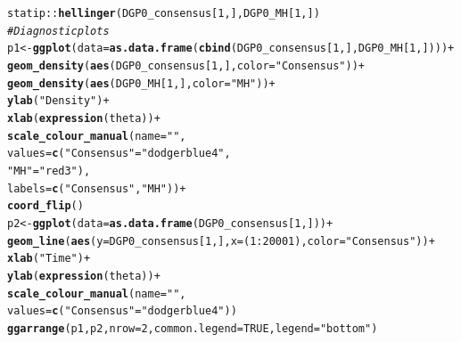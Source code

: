 \documentclass[11pt,a4paper]{report}\usepackage[]{graphicx}\usepackage[]{color}
\makeatletter
\newcommand{\hlnum}[1]{\textcolor[rgb]{0.686,0.059,0.569}{#1}}%
\newcommand{\hlstr}[1]{\textcolor[rgb]{0.192,0.494,0.8}{#1}}%
\newcommand{\hlcom}[1]{\textcolor[rgb]{0.678,0.584,0.686}{\textit{#1}}}%
\newcommand{\hlopt}[1]{\textcolor[rgb]{0,0,0}{#1}}%
\newcommand{\hlstd}[1]{\textcolor[rgb]{0.345,0.345,0.345}{#1}}%
\newcommand{\hlkwb}[1]{\textcolor[rgb]{0.69,0.353,0.396}{#1}}%
\newcommand{\hlkwc}[1]{\textcolor[rgb]{0.333,0.667,0.333}{#1}}%
\newcommand{\hlkwd}[1]{\textcolor[rgb]{0.737,0.353,0.396}{\textbf{#1}}}%
\newenvironment{kframe}{%
 \def\at@end@of@kframe{}%
 \ifinner\ifhmode%
  \def\at@end@of@kframe{\end{minipage}}%
  \begin{minipage}{\columnwidth}%
 \fi\fi%
 \def\FrameCommand##1{\hskip\@totalleftmargin \hskip-\fboxsep
 \colorbox{shadecolor}{##1}\hskip-\fboxsep
     \hskip-\linewidth \hskip-\@totalleftmargin \hskip\columnwidth}%
 \MakeFramed {\advance\hsize-\width
   \@totalleftmargin\z@ \linewidth\hsize
   \@setminipage}}%
 {\par\unskip\endMakeFramed%
 \at@end@of@kframe}
\newenvironment{knitrout}{}{} %
\makeatother
\begin{document}
\begin{appendix}
\begin{knitrout}
\begin{kframe}
\begin{alltt}
\hlstd{statip}\hlopt{::}\hlkwd{hellinger}\hlstd{(DGP0_consensus[}\hlnum{1}\hlstd{,],DGP0_MH[}\hlnum{1}\hlstd{,])}
\hlcom{#Diagnostic plots}
\hlstd{p1}\hlkwb{<-}\hlkwd{ggplot}\hlstd{(}\hlkwc{data}\hlstd{=}\hlkwd{as.data.frame}\hlstd{(}\hlkwd{cbind}\hlstd{(DGP0_consensus[}\hlnum{1}\hlstd{,],DGP0_MH[}\hlnum{1}\hlstd{,])))}\hlopt{+}
 \hlkwd{geom_density}\hlstd{(}\hlkwd{aes}\hlstd{(DGP0_consensus[}\hlnum{1}\hlstd{,],}\hlkwc{color}\hlstd{=}\hlstr{"Consensus"}\hlstd{))}\hlopt{+}
 \hlkwd{geom_density}\hlstd{(}\hlkwd{aes}\hlstd{(DGP0_MH[}\hlnum{1}\hlstd{,],}\hlkwc{color}\hlstd{=}\hlstr{"MH"}\hlstd{))}\hlopt{+}
 \hlkwd{ylab}\hlstd{(}\hlstr{"Density"}\hlstd{)}\hlopt{+}
 \hlkwd{xlab}\hlstd{(}\hlkwd{expression}\hlstd{(theta))}\hlopt{+}
 \hlkwd{scale_colour_manual}\hlstd{(}\hlkwc{name}\hlstd{=}\hlstr{""}\hlstd{,}
                     \hlkwc{values}\hlstd{=}\hlkwd{c}\hlstd{(}\hlstr{"Consensus"}\hlstd{=}\hlstr{"dodgerblue4"}\hlstd{,}
                              \hlstr{"MH"}\hlstd{=}\hlstr{"red3"}\hlstd{),}
                     \hlkwc{labels}\hlstd{=}\hlkwd{c}\hlstd{(}\hlstr{"Consensus"}\hlstd{,}\hlstr{"MH"}\hlstd{))}\hlopt{+}
 \hlkwd{coord_flip}\hlstd{()}
\hlstd{p2}\hlkwb{<-}\hlkwd{ggplot}\hlstd{(}\hlkwc{data}\hlstd{=}\hlkwd{as.data.frame}\hlstd{(DGP0_consensus[}\hlnum{1}\hlstd{,]))}\hlopt{+}
 \hlkwd{geom_line}\hlstd{(}\hlkwd{aes}\hlstd{(}\hlkwc{y}\hlstd{=DGP0_consensus[}\hlnum{1}\hlstd{,],} \hlkwc{x}\hlstd{=(}\hlnum{1}\hlopt{:}\hlnum{20001}\hlstd{),}\hlkwc{color}\hlstd{=}\hlstr{"Consensus"}\hlstd{))}\hlopt{+}
 \hlkwd{xlab}\hlstd{(}\hlstr{"Time"}\hlstd{)}\hlopt{+}
 \hlkwd{ylab}\hlstd{(}\hlkwd{expression}\hlstd{(theta))}\hlopt{+}
 \hlkwd{scale_colour_manual}\hlstd{(}\hlkwc{name}\hlstd{=}\hlstr{""}\hlstd{,}
                     \hlkwc{values}\hlstd{=}\hlkwd{c}\hlstd{(}\hlstr{"Consensus"}\hlstd{=}\hlstr{"dodgerblue4"}\hlstd{))}
\hlkwd{ggarrange}\hlstd{(p1, p2,} \hlkwc{nrow}\hlstd{=}\hlnum{2}\hlstd{,} \hlkwc{common.legend} \hlstd{=} \hlnum{TRUE}\hlstd{,} \hlkwc{legend}\hlstd{=}\hlstr{"bottom"}\hlstd{)}


\end{alltt}
\end{kframe}
\end{knitrout}
\end{appendix}
\end{document}
